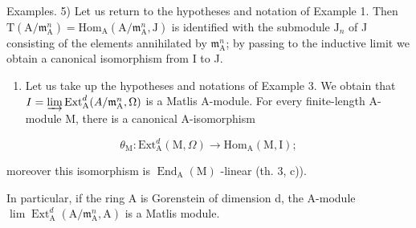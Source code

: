 Examples. 5) Let us return to the hypotheses and notation of Example 1. Then \(\mathrm{T}(\mathrm{A} / \mathfrak{m}_{\mathrm{A}}^{n}) = \mathrm{Hom}_{\mathrm{A}}(\mathrm{A} / \mathfrak{m}_{\mathrm{A}}^{n},\mathrm{J})\) is identified with the submodule \(\mathrm{J}_n\) of J consisting of the elements annihilated by \(\mathfrak{m}_{\mathrm{A}}^{n}\); by passing to the inductive limit we obtain a canonical isomorphism from I to J.

\begin{enumerate}
\def\labelenumi{\arabic{enumi})}
\setcounter{enumi}{5}
\tightlist
\item
  Let us take up the hypotheses and notations of Example 3. We obtain that \(I = \varinjlim \operatorname{Ext}_{\mathrm{A}}^{d}(A / \mathfrak{m}_{\mathrm{A}}^{n}, \Omega)\) is a Matlis A-module. For every finite-length A-module M, there is a canonical A-isomorphism
\end{enumerate}

\[
\theta_ {\mathrm{M}}: \mathrm{Ext} _ {\mathrm{A}} ^ {d} (\mathrm{M}, \Omega) \longrightarrow \mathrm{Hom} _ {\mathrm{A}} (\mathrm{M}, \mathrm{I});
\]

moreover this isomorphism is \(\operatorname{End}_{\mathrm{A}}(\mathrm{M})\) -linear (th. 3, c)).

In particular, if the ring A is Gorenstein of dimension d, the A-module \(\lim\operatorname{Ext}_{\mathrm{A}}^{d}(\mathrm{A}/\mathfrak{m}_{\mathrm{A}}^{n},\mathrm{A})\) is a Matlis module.

